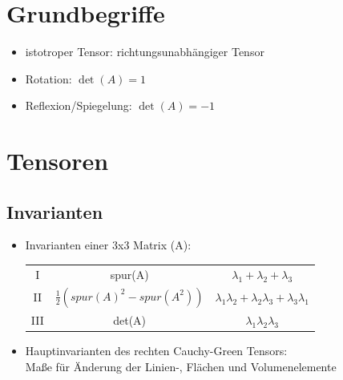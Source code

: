 \documentclass[fleqn,twoside]{article}
\title{\Huge{\textfrak{Kontinuumsmechanik}}}
\author{\calligra{Jonas Konrad}}
\date{\textfrak{\today}}
\begin{document}
\parindent 0pt
\fancyfoot[R]{\frakfamily }
\maketitle \thispagestyle{empty}
\begin{center}
\end{center}
\tableofcontents
\newpage

\section{Grundbegriffe}
\begin{itemize}
    \item istotroper Tensor: richtungsunabhängiger Tensor
    \item Rotation: $\det(A)=1$
    \item Reflexion/Spiegelung: $\det(A)=-1$
\end{itemize}


\section{Tensoren}

\subsection{Invarianten}
\begin{itemize}
    \item Invarianten einer 3x3 Matrix (A):
        \begin{tabular}{c|c|c}
            I & spur(A) & $\lambda_1 + \lambda_2 + \lambda_3$ \\
            II & $\frac12 (spur(A)^2-spur(A^2))$ & $\lambda_1\lambda_2+\lambda_2\lambda_3+\lambda_3\lambda_1$ \\
            III & det(A) & $\lambda_1\lambda_2\lambda_3$
        \end{tabular}
    \item Hauptinvarianten des rechten Cauchy-Green Tensors: \\Maße für Änderung der Linien-, Flächen und Volumenelemente
\end{itemize}
\end{document}
